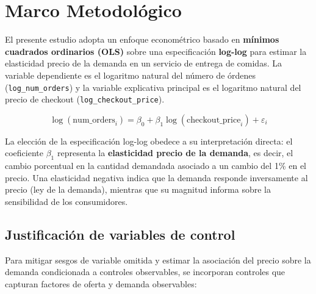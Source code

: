 \documentclass[doc, a4paper, biblatex, floatsintext, longtable, babel]{apa7}
\begin{document}
\section{Marco Metodol\'ogico}
\label{sec:marco-metodologico}

El presente estudio adopta un enfoque econom\'etrico basado en \textbf{m\'inimos cuadrados ordinarios (OLS)} sobre una especificaci\'on \textbf{log-log} para estimar la elasticidad precio de la demanda en un servicio de entrega de comidas. La variable dependiente es el logaritmo natural del n\'umero de \'ordenes (\texttt{log\_num\_orders}) y la variable explicativa principal es el logaritmo natural del precio de checkout (\texttt{log\_checkout\_price}).

\begin{equation}
\log(\text{num\_orders}_i) = \beta_0 + \beta_1 \log(\text{checkout\_price}_i) + \varepsilon_i
\label{eq:modelo-base}
\end{equation}

La elecci\'on de la especificaci\'on log-log obedece a su interpretaci\'on directa: el coeficiente $\beta_1$ representa la \textbf{elasticidad precio de la demanda}, es decir, el cambio porcentual en la cantidad demandada asociado a un cambio del 1\% en el precio. Una elasticidad negativa indica que la demanda responde inversamente al precio (ley de la demanda), mientras que su magnitud informa sobre la sensibilidad de los consumidores.

\subsection{Justificaci\'on de variables de control}

Para mitigar sesgos de variable omitida y estimar la asociación del precio sobre la demanda condicionada a controles observables, se incorporan controles que capturan factores de oferta y demanda observables:
\end{document}
